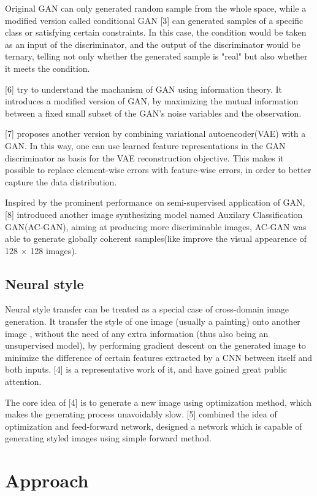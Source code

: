 \documentclass{article}
\begin{document}
Original GAN can only generated random sample from the whole space, while a modified version called conditional GAN [3] can generated samples of a specific class or satisfying certain constraints. In this case, the condition would be taken as an input of the discriminator, and the output of the discriminator would be ternary, telling not only whether the generated sample is "real" but also whether it meets the condition.

[6] try to understand the machanism of GAN using information theory. It introduces a modified version of GAN, by maximizing the mutual information between a fixed small subset of the GAN's noise variables and the observation.

[7] proposes another version by combining variational autoencoder(VAE) with a GAN. In this way, one can use learned feature representations in the GAN discriminator as basis for the VAE reconstruction objective. This makes it possible to replace element-wise errors with feature-wise errors, in order to better capture the data distribution. 

Inspired by the prominent performance on semi-supervised application of GAN, [8] introduced another image synthesizing model named Auxilary Classification GAN(AC-GAN), aiming at producing more discriminable images, AC-GAN was able to generate globally coherent samples(like improve the visual appearence of 128 $\times$ 128 images).

\subsection{Neural style}

Neural style transfer can be treated as a special case of cross-domain image generation. It transfer the style of one image (usually a painting) onto another image , without the need of any extra information (thus also being an unsupervised model), by performing gradient descent on the generated image to minimize the difference of certain features extracted by a CNN between itself and both inputs. [4] is a representative work of it, and have gained great public attention.

The core idea of [4] is to generate a new image using optimization method, which makes the generating process unavoidably slow. [5] combined the idea of optimization and feed-forward network, designed a network which is capable of generating styled images using simple forward method.  

\section{Approach}
\end{document}
